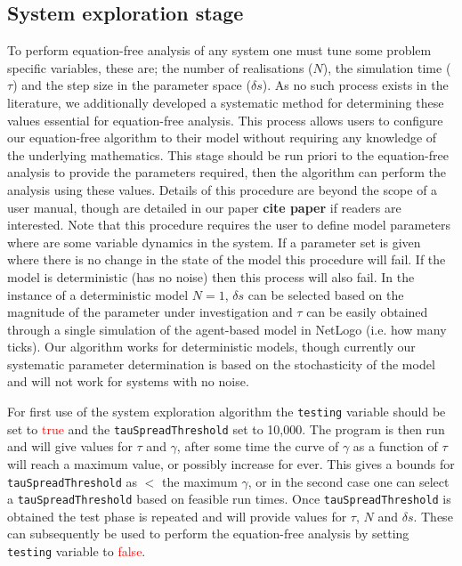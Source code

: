 \documentclass[11pt]{article}
\begin{document}
\subsection{System exploration stage}
\label{sec:test}
To perform equation-free analysis of any system one must tune some problem specific variables, these are; the number of realisations ($N$), the simulation time ($\tau$) and the step size in the parameter space ($\delta s$). As no such process exists in the literature, we additionally developed a systematic method for determining these values essential for equation-free analysis. This process allows users to configure our equation-free algorithm to their model without requiring any knowledge of the underlying mathematics. This stage should be run priori to the equation-free analysis to provide the parameters required, then the algorithm can perform the analysis using these values. Details of this procedure are beyond the scope of a user manual, though are detailed in our paper {\bf cite paper} if readers are interested. Note that this procedure requires the user to define model parameters where are some variable dynamics in the system. If a parameter set is given where there is no change in the state of the model this procedure will fail. If the model is deterministic (has no noise) then this process will also fail. In the instance of a deterministic model $N=1$, $\delta s$ can be selected based on the magnitude of the parameter under investigation and $\tau$ can be easily obtained through a single simulation of the agent-based model in NetLogo (i.e. how many ticks). Our algorithm works for deterministic models, though currently our systematic parameter determination is based on the stochasticity of the model and will not work for systems with no noise. 

For first use of the system exploration algorithm the {\tt testing} variable should be set to \textcolor{red}{true} and the {\tt tauSpreadThreshold} set to 10,000. The program is then run and will give values for $\tau$ and $\gamma$, after some time the curve of $\gamma$ as a function of $\tau$ will reach a maximum value, or possibly increase for ever. This gives a bounds for {\tt tauSpreadThreshold} as $<$ the maximum $\gamma$, or in the second case one can select a {\tt tauSpreadThreshold} based on feasible run times. Once {\tt tauSpreadThreshold} is obtained the test phase is repeated and will provide values for $\tau$, $N$ and $\delta s$. These can subsequently be used to perform the equation-free analysis by setting {\tt testing} variable to \textcolor{red}{false}.
\end{document}
